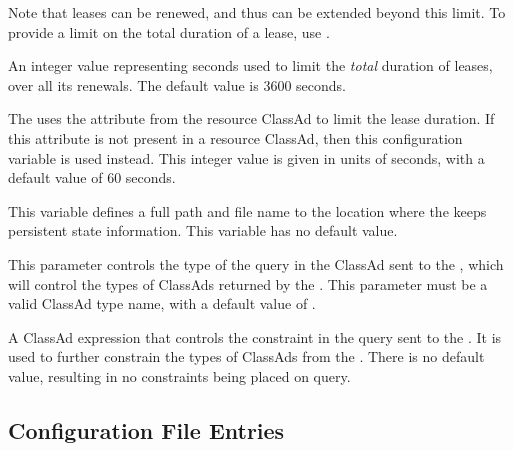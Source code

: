 \begin{description}
  Note that leases can be renewed, and thus can be extended beyond this
  limit.  To provide a limit on the total duration of a lease, use 
  .

\label{param:LeaseManager.MaxTotalLeaseDuration}
\item[\Macro{LeaseManager.MAX\_TOTAL\_LEASE\_DURATION}]
  An integer value representing seconds used to limit
  the \emph{total} duration of leases, over
  all its renewals.  
  The default value is 3600 seconds.

\label{param:LeaseManager.DefaultMaxLeaseDuration}
\item[\Macro{LeaseManager.DEFAULT\_MAX\_LEASE\_DURATION}]
  The  uses the
   attribute from the resource ClassAd to limit the
  lease duration.  If this attribute is not present in a resource
  ClassAd, then this configuration variable is used instead.
  This integer value is given in units of seconds,
  with a default value of 60 seconds.

\label{param:LeaseManager.ClassadLog}
\item[\Macro{LeaseManager.CLASSAD\_LOG}]
  This variable defines a full path and file name to the location
  where the  keeps persistent state information.
  This variable has no default value.

\label{param:LeaseManager.QueryAdtype}
\item[\Macro{LeaseManager.QUERY\_ADTYPE}]
  This parameter controls the type of the query in the ClassAd sent to
  the , which will control the types of ClassAds
  returned by the .  This parameter must be a valid
  ClassAd type name, with a default value of .

\label{param:LeaseManager.QueryConstraints}
\item[\Macro{LeaseManager.QUERY\_CONSTRAINTS}]
  A ClassAd expression that controls the constraint in the query sent to the
  .
  It is used to further constrain the types
  of ClassAds from the .
  There is no default value, resulting in no constraints being placed on query.

\end{description}

\subsection{\label{sec:HDFS-Config-File-Entries}
Configuration File Entries}

